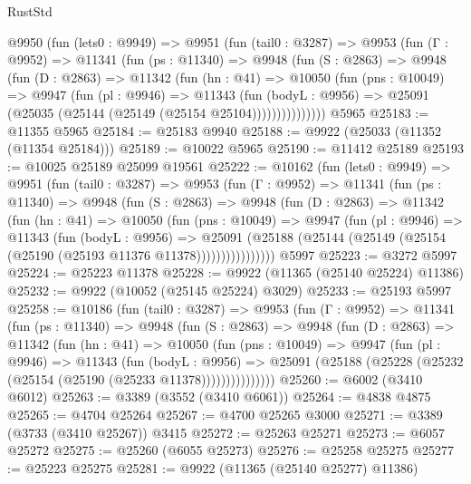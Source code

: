 \begin{lexlean}{RustStd}
\begin{coremodule}
    @9950
      (fun (lets0 : @9949) =>
      @9951
        (fun (tail0 : @3287) =>
        @9953
          (fun (Γ : @9952) =>
          @11341
            (fun (ps : @11340) =>
            @9948
              (fun (S : @2863) =>
              @9948
                (fun (D : @2863) =>
                @11342
                  (fun (hn : @41) =>
                  @10050
                    (fun (pns : @10049) =>
                    @9947
                      (fun (pl : @9946) =>
                      @11343
                        (fun (bodyL : @9956) =>
                        @25091 (@25035 (@25144 (@25149 (@25154 @25104)))))))))))))))
    @5965
@25183 := @11355 @5965
@25184 := @25183 @9940
@25188 := @9922 (@25033 (@11352 (@11354 @25184)))
@25189 := @10022 @5965
@25190 := @11412 @25189
@25193 := @10025 @25189 @25099 @19561
@25222 := @10162
    (fun (lets0 : @9949) =>
    @9951
      (fun (tail0 : @3287) =>
      @9953
        (fun (Γ : @9952) =>
        @11341
          (fun (ps : @11340) =>
          @9948
            (fun (S : @2863) =>
            @9948
              (fun (D : @2863) =>
              @11342
                (fun (hn : @41) =>
                @10050
                  (fun (pns : @10049) =>
                  @9947
                    (fun (pl : @9946) =>
                    @11343
                      (fun (bodyL : @9956) =>
                      @25091
                        (@25188
                          (@25144 (@25149 (@25154 (@25190 (@25193 @11376 @11378))))))))))))))))
    @5997
@25223 := @3272 @5997
@25224 := @25223 @11378
@25228 := @9922 (@11365 (@25140 @25224) @11386)
@25232 := @9922 (@10052 (@25145 @25224) @3029)
@25233 := @25193 @5997
@25258 := @10186
    (fun (tail0 : @3287) =>
    @9953
      (fun (Γ : @9952) =>
      @11341
        (fun (ps : @11340) =>
        @9948
          (fun (S : @2863) =>
          @9948
            (fun (D : @2863) =>
            @11342
              (fun (hn : @41) =>
              @10050
                (fun (pns : @10049) =>
                @9947
                  (fun (pl : @9946) =>
                  @11343
                    (fun (bodyL : @9956) =>
                    @25091 (@25188 (@25228 (@25232 (@25154 (@25190 (@25233 @11378)))))))))))))))
@25260 := @6002 (@3410 @6012)
@25263 := @3389 (@3552 (@3410 @6061))
@25264 := @4838 @4875
@25265 := @4704 @25264
@25267 := @4700 @25265 @3000
@25271 := @3389 (@3733 (@3410 @25267)) @3415
@25272 := @25263 @25271
@25273 := @6057 @25272
@25275 := @25260 (@6055 @25273)
@25276 := @25258 @25275
@25277 := @25223 @25275
@25281 := @9922 (@11365 (@25140 @25277) @11386)

\end{coremodule}
\end{lexlean}
